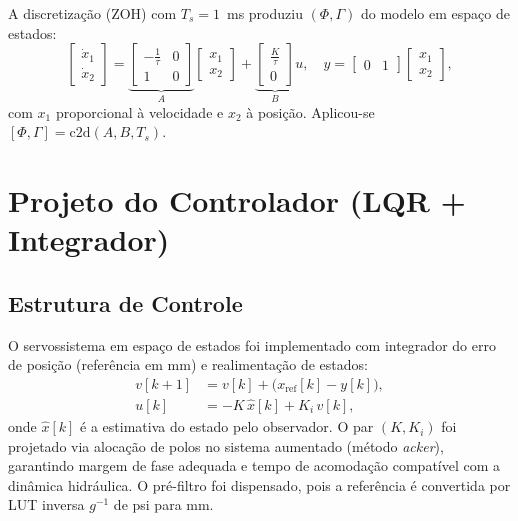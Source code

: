 A discretização (ZOH) com $T_s = 1$~ms produziu $(\Phi, \Gamma)$ do modelo em espaço de estados:
\[
  \begin{bmatrix} \dot{x}_1 \\ \dot{x}_2 \end{bmatrix}
  =
  \underbrace{\begin{bmatrix} -\frac{1}{\tau} & 0 \\ 1 & 0 \end{bmatrix}}_{A}
  \begin{bmatrix} x_1 \\ x_2 \end{bmatrix}
  +
  \underbrace{\begin{bmatrix} \frac{K}{\tau} \\ 0 \end{bmatrix}}_{B} u, 
  \quad y = \begin{bmatrix} 0 & 1 \end{bmatrix} \begin{bmatrix} x_1 \\ x_2 \end{bmatrix},
\]
com $x_1$ proporcional à velocidade e $x_2$ à posição. Aplicou-se $[\Phi,\Gamma] = \text{c2d}(A,B,T_s)$.


\section{Projeto do Controlador (LQR + Integrador)}
\subsection{Estrutura de Controle}
O servossistema em espaço de estados foi implementado com integrador do erro de posição (referência em mm) e realimentação de estados:
\begin{align}
  v[k+1] &= v[k] + \big(x_{\text{ref}}[k] - y[k]\big), \\
  u[k]   &= -K\,\hat{x}[k] + K_i\,v[k],
\end{align}
onde $\hat{x}[k]$ é a estimativa do estado pelo observador. O par $(K, K_i)$ foi projetado via alocação de polos no sistema aumentado (método \emph{acker}), garantindo margem de fase adequada e tempo de acomodação compatível com a dinâmica hidráulica. O pré-filtro foi dispensado, pois a referência é convertida por LUT inversa $g^{-1}$ de psi para mm.

